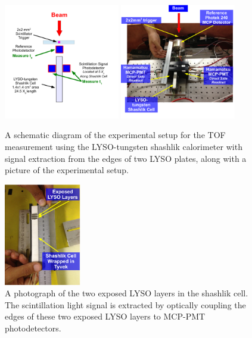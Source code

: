 \begin{figure}[h] \centering
\includegraphics[width=0.45\textwidth]{figs/ShashlikSideReadoutSetupSchematic} 
\includegraphics[width=0.45\textwidth]{figs/ShashlikSideReadoutPhotoB} 
\caption{ \small A schematic diagram of the experimental setup for the
TOF measurement using the LYSO-tungsten shashlik calorimeter
with signal extraction from the edges of two LYSO plates, along
with a picture of the experimental setup. } 
\label{fig:ShashlikSideReadoutSetup}
\end{figure}

\begin{figure}[h] \centering
\includegraphics[width=0.30\textwidth]{figs/ShashlikSideReadoutPhotoA} 
\caption{\small A photograph of the two exposed LYSO layers in the shashlik cell.
The scintillation light signal is extracted by optically coupling
the edges of these two exposed LYSO layers to MCP-PMT
photodetectors. } 
\label{fig:ShashlikSideReadoutExposedLayersPhoto}
\end{figure}


